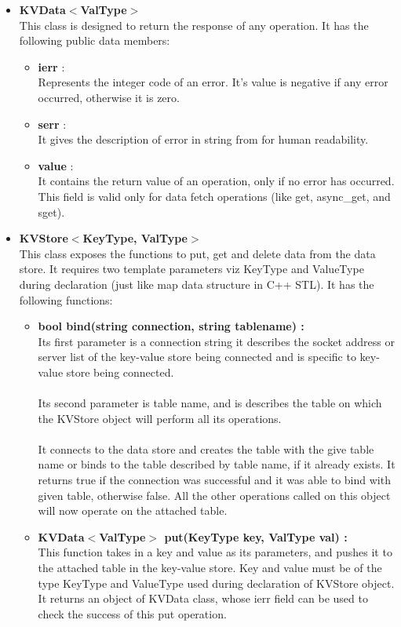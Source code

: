 \documentclass[11pt]{article}
\begin{document}
\begin{itemize}
\item \textbf{KVData$<$ValType$>$}\\
This class is designed to return the response of any operation. It has the following public data members:
\begin{itemize}
\item \textbf{ierr} :\\
Represents the integer code of an error. It's value is negative if any error occurred, otherwise it is zero.
\item \textbf{serr} :\\
It gives the description of error in string from for human readability.
\item \textbf{value} :\\
It contains the return value of an operation, only if no error has occurred. This field is valid only for data fetch operations (like get, async\_get, and sget).
\end{itemize}

\item \textbf{KVStore$<$KeyType, ValType$>$}\\
This class exposes the functions to put, get and delete data from the data store. It requires two template parameters viz KeyType and ValueType during declaration (just like map data structure in C++ STL).
It has the following functions:
\begin{itemize}
\item \textbf{bool bind(string connection, string tablename) :} \\
Its first parameter is a connection string it describes the socket address or server list of the key-value store being connected and is specific to key-value store being connected. 
\\\\Its second parameter is table name, and is describes the table on which the KVStore object will perform all its operations. 
\\\\It connects to the data store and creates the table with the give table name or binds to the table described by table name, if it already exists. It returns true if the connection was successful and it was able to bind with given table, otherwise false. All the other operations called on this object will now operate on the attached table.\\

\item \textbf{KVData$<$ValType$>$ put(KeyType key, ValType val) :}\\
This function takes in a key and value as its parameters, and pushes it to the attached table in the key-value store. Key and value must be of the type KeyType and ValueType used during declaration of KVStore object. It returns an object of KVData class, whose ierr field can be used to check the success of this put operation.\\


\end{itemize}
\end{itemize}
\end{document}

